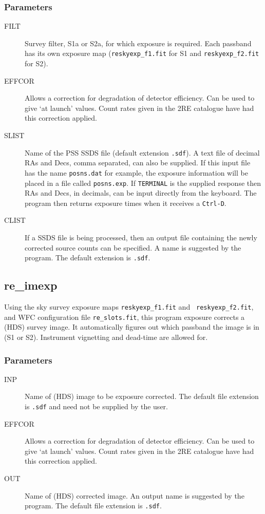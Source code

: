 \subsubsection{Parameters}

\begin{description}

\item[FILT  ]
Survey filter, S1a or S2a, for which exposure is required.  Each passband has
its own exposure map ({\tt reskyexp\_f1.fit} for S1 and {\tt reskyexp\_f2.fit}
for S2).
\item[EFFCOR  ]
 Allows a correction for degradation of detector efficiency.  Can be used
to give `at launch' values.  Count rates given in the 2RE catalogue have
had this correction applied.
\item[SLIST  ]
Name of the PSS SSDS file (default extension {\tt .sdf}).  A text file of
decimal RAs and Decs, comma   separated, can also be supplied.  If this input
file has the name {\tt posns.dat} for example, the exposure information will
be placed  in a file called {\tt posns.exp}.  If {\tt TERMINAL} is the supplied
response then RAs and Decs, in decimals, can be input directly from the
keyboard. The program then returns exposure times when it receives
a {\tt Ctrl-D}.
\item[CLIST   ]
 If a SSDS file is being processed, then an output file containing the
 newly corrected source counts can be specified.  A name is suggested by
the program.  The default extension is {\tt .sdf}.
\end{description}

\subsection{\label{ss_re_imexp}re\_imexp}

Using the sky survey exposure maps {\tt reskyexp\_f1.fit} and {\tt
reskyexp\_f2.fit}, and WFC configuration file {\tt re\_slots.fit},
this program exposure corrects a (HDS) survey image.  It automatically
figures out which passband the image is in (S1 or S2).  Instrument
vignetting and dead-time are allowed for.

\subsubsection{Parameters}

\begin{description}
\item[INP   ]
Name of (HDS) image to be exposure corrected.  The default file extension
is {\tt .sdf} and need not be supplied by the user.
\item[EFFCOR  ]
Allows a correction for degradation of detector efficiency.  Can be used
to give `at launch' values.  Count rates given in the 2RE catalogue have
had this correction applied.
\item[OUT   ]
Name of (HDS) corrected image.  An output name is suggested by the
program. The default file extension is {\tt .sdf}.
\end{description}

